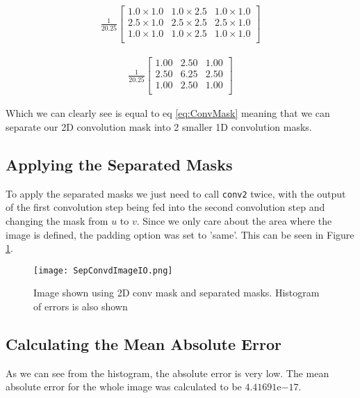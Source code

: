 \begin{gather}
    \frac{1}{20.25}
    \begin{bmatrix}
        1.0 \times 1.0 & 1.0 \times 2.5 & 1.0 \times 1.0 \\
        2.5 \times 1.0 & 2.5 \times 2.5 & 2.5 \times 1.0 \\
        1.0 \times 1.0 & 1.0 \times 2.5 & 1.0 \times 1.0 \\
    \end{bmatrix}
\end{gather}

\begin{gather}
    \frac{1}{20.25}
    \begin{bmatrix}
        1.00 & 2.50 & 1.00 \\
        2.50 & 6.25 & 2.50 \\
        1.00 & 2.50 & 1.00 \\
    \end{bmatrix}
\end{gather}

\noindent Which we can clearly see is equal to eq \ref{eq:ConvMask} meaning that we can separate our 2D convolution mask into 2 smaller 1D convolution masks.

\subsection{Applying the Separated Masks}
To apply the separated masks we just need to call \textcolor{MATLABBlue}{\lstinline|conv2|} twice, with the output of the first convolution step being fed into the second convolution step and changing the mask from $u$ to $v$. Since we only care about the area where the image is defined, the padding option was set to \textcolor{MATLABPurple}{'same'}. This can be seen in Figure \ref{fig:SepConvIO}.

\begin{figure}[!h]
    \texttt{[image: SepConvdImageIO.png]}
    \centering
    \caption{Image shown using 2D conv mask and separated masks. Histogram of errors is also shown}
    \label{fig:SepConvIO}
\end{figure}

\subsection{Calculating the Mean Absolute Error}
\noindent As we can see from the histogram, the absolute error is very low. The mean absolute error for the whole image was calculated to be $4.41691\mathrm{e}{-17}$.
